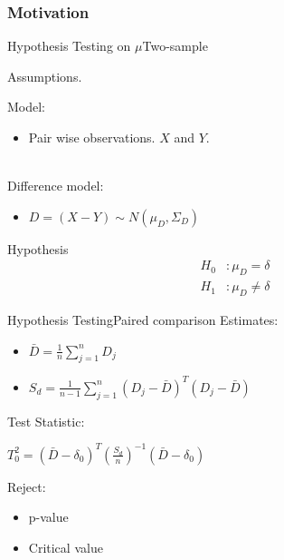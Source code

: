 \documentclass[aspectratio=169,10pt,t]{beamer}
\begin{document}
\begin{frame}[t]
	\frametitle{Motivation}

\end{frame}

\begin{frame}{Hypothesis Testing on $\mu$}{Two-sample}

	Assumptions.

	Model:
	\begin{itemize}
		\item Pair wise observations. $X$ and $Y$.
	\end{itemize}
	\\
	Difference model:
	\begin{itemize}
		\item 
			$ D =   \left( X - Y  \right)  \sim N \left( \mu_D, \Sigma_D  \right)  $
	\end{itemize}

	Hypothesis
	\begin{align*}
		H_0&: \mu_D = \delta\\
		H_1&: \mu_D \neq \delta
	\end{align*}

\end{frame}

\begin{frame}{Hypothesis Testing}{Paired comparison}
	Estimates: \\
	\begin{itemize}
		\item $\bar{D} = \frac{1}{n} \sum^n_{j=1} D_j$ 
		\item $S_d = \frac{1}{n-1} \sum^n_{j=1} \left(D_j - \bar{D} \right)^T \left(D_j - \bar{D} \right)$ 
	\end{itemize}
	Test Statistic: \\
	\begin{center}
		\quad $T_0^2 = \left( \bar{D} - \delta_0 \right)^T \left( \frac{S_d}{n}  \right) ^{-1} \left( \bar{D} - \delta_0 \right)$ \\
	\end{center}
	Reject: \\
	\begin{itemize}
		\item p-value
		\item Critical value
	\end{itemize}
\end{frame}
\end{document}
